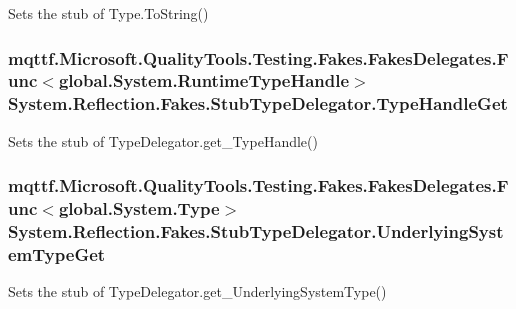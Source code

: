 Sets the stub of Type.\-To\-String()

\hypertarget{class_system_1_1_reflection_1_1_fakes_1_1_stub_type_delegator_a3c2584bce642a42722469ae2293d0d01}{
\subsubsection[{Type\-Handle\-Get}]{\setlength{\rightskip}{0pt plus 5cm}mqttf.\-Microsoft.\-Quality\-Tools.\-Testing.\-Fakes.\-Fakes\-Delegates.\-Func$<$global.\-System.\-Runtime\-Type\-Handle$>$ System.\-Reflection.\-Fakes.\-Stub\-Type\-Delegator.\-Type\-Handle\-Get}}\label{class_system_1_1_reflection_1_1_fakes_1_1_stub_type_delegator_a3c2584bce642a42722469ae2293d0d01}


Sets the stub of Type\-Delegator.\-get\-\_\-\-Type\-Handle()

\hypertarget{class_system_1_1_reflection_1_1_fakes_1_1_stub_type_delegator_aa95dd315795e8fd2ce51f49d0c87bb97}{
\subsubsection[{Underlying\-System\-Type\-Get}]{\setlength{\rightskip}{0pt plus 5cm}mqttf.\-Microsoft.\-Quality\-Tools.\-Testing.\-Fakes.\-Fakes\-Delegates.\-Func$<$global.\-System.\-Type$>$ System.\-Reflection.\-Fakes.\-Stub\-Type\-Delegator.\-Underlying\-System\-Type\-Get}}\label{class_system_1_1_reflection_1_1_fakes_1_1_stub_type_delegator_aa95dd315795e8fd2ce51f49d0c87bb97}


Sets the stub of Type\-Delegator.\-get\-\_\-\-Underlying\-System\-Type()



